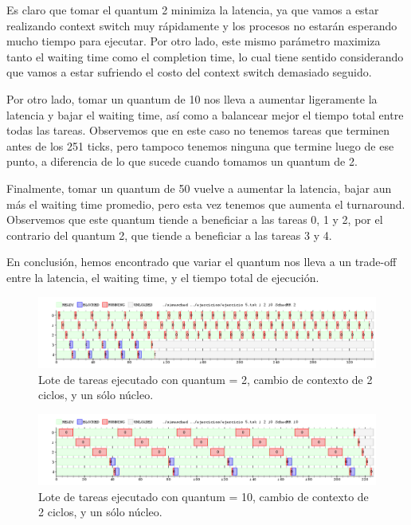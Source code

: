 \documentclass{article}
\begin{document}
Es claro que tomar el quantum 2 minimiza la latencia, ya que vamos a estar realizando context switch muy rápidamente y los procesos no estarán esperando mucho tiempo para ejecutar. Por otro lado, este mismo parámetro maximiza tanto el waiting time como el completion time, lo cual tiene sentido considerando que vamos a estar sufriendo el costo del context switch demasiado seguido.

Por otro lado, tomar un quantum de 10 nos lleva a aumentar ligeramente la latencia y bajar el waiting time, así como a balancear mejor el tiempo total entre todas las tareas. Observemos que en este caso no tenemos tareas que terminen antes de los 251 ticks, pero tampoco tenemos ninguna que termine luego de ese punto, a diferencia de lo que sucede cuando tomamos un quantum de 2.

Finalmente, tomar un quantum de 50 vuelve a aumentar la latencia, bajar aun más el waiting time promedio, pero esta vez tenemos que aumenta el turnaround. Observemos que este quantum tiende a beneficiar a las tareas 0, 1 y 2, por el contrario del quantum 2, que tiende a beneficiar a las tareas 3 y 4.

En conclusión, hemos encontrado que variar el quantum nos lleva a un trade-off entre la latencia, el waiting time, y el tiempo total de ejecución.

\begin{figure}[h!]
\caption{Lote de tareas ejecutado con quantum = 2, cambio de contexto de 2 ciclos, y un sólo núcleo. \label{grf:ex5-1}}
\centering
\includegraphics[width=15cm]{../ejercicios/ejercicio 5 - quantum 2}
\end{figure}

\begin{figure}[h!]
\caption{Lote de tareas ejecutado con quantum = 10, cambio de contexto de 2 ciclos, y un sólo núcleo. \label{grf:ex5-10}}
\centering
\includegraphics[width=15cm]{../ejercicios/ejercicio 5 - quantum 10}
\end{figure}
\end{document}
